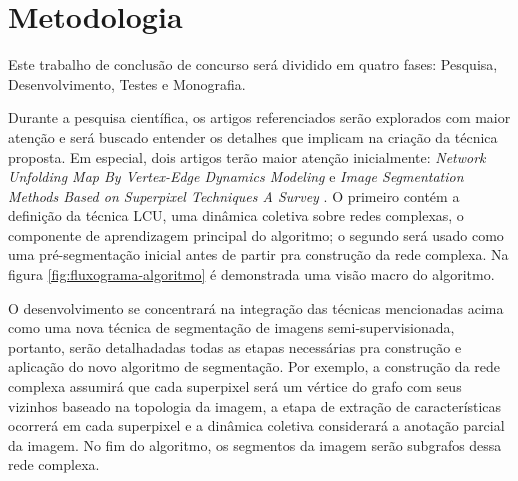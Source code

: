 \chapter{Metodologia}\label{cap:metodologia}


Este trabalho de conclusão de concurso será dividido em quatro fases:
Pesquisa, Desenvolvimento, Testes e Monografia.

Durante a pesquisa científica, os artigos referenciados serão explorados com
maior atenção e será buscado entender os detalhes que implicam
na criação da técnica proposta. Em especial, dois artigos terão maior
atenção inicialmente: \textit{Network Unfolding Map By Vertex-Edge
  Dynamics Modeling} \cite{VerriNetworkUnfoldingMap2018} e
\textit{Image Segmentation Methods Based on Superpixel Techniques A
  Survey} \cite{SuperpixelSurvey2020}. O primeiro contém a definição
da técnica LCU, uma dinâmica coletiva sobre redes complexas, o
componente de aprendizagem principal do algoritmo; o segundo será
usado como uma pré-segmentação inicial antes de partir pra construção
da rede complexa. Na figura \ref{fig:fluxograma-algoritmo} é demonstrada uma
visão macro do algoritmo.

\begin{figure}[!h]
        \captionsetup{width=8cm}
		\centering
\end{figure}


O desenvolvimento se concentrará na integração das técnicas
mencionadas acima como uma nova técnica de segmentação de imagens
semi-supervisionada, portanto, serão detalhadadas todas as
etapas necessárias pra construção e aplicação do novo algoritmo de
segmentação. Por exemplo, a construção da rede complexa assumirá
que cada superpixel será um vértice do grafo com seus vizinhos baseado
na topologia da imagem, a etapa de extração de características
ocorrerá em cada superpixel e a dinâmica coletiva considerará a
anotação parcial da imagem. No fim do algoritmo, os segmentos da
imagem serão subgrafos dessa rede complexa.

